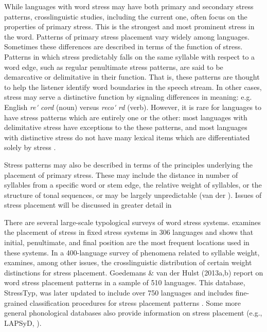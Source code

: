   While languages with word stress may have both primary and secondary stress patterns, crosslinguistic studies, including the current one, often focus on the properties of primary stress. This is the strongest and most prominent stress in the word. Patterns of primary stress placement vary widely among languages. Sometimes these differences are described in terms of the function of stress. Patterns in which stress predictably falls on the same syllable with respect to a word edge, such as regular penultimate stress patterns, are said to be demarcative or delimitative in their function. That is, these patterns are thought to help the listener identify word boundaries in the speech stream. In other cases, stress may serve a distinctive function by signaling differences in meaning: e.g. English \textit{re\'{} cord} (noun) versus \textit{reco\'{} rd} (verb). However, it is rare for languages to have stress patterns which are entirely one or the other: most languages with delimitative stress have exceptions to the these patterns, and most languages with distinctive stress do not have many lexical items which are differentiated solely by stress \citep[14-15]{Cruttenden1997}. 



  Stress patterns may also be described in terms of the principles underlying the placement of primary stress. These may include the distance in number of syllables from a specific word or stem edge, the relative weight of syllables, or the structure of tonal sequences, or may be largely unpredictable (van der \citealt{Hulst2010}). Issues of stress placement will be discussed in greater detail in 



  There are several large-scale typological surveys of word stress systems. \citet{Hyman1977} examines the placement of stress in fixed stress systems in 306 languages and shows that initial, penultimate, and final position are the most frequent locations used in these systems. In a 400-language survey of phenomena related to syllable weight, \citet{Gordon2006} examines, among other issues, the crosslinguistic distribution of certain weight distinctions for stress placement. Goedemans \& van der Hulst (2013a,b) report on word stress placement patterns in a sample of 510 languages. This database, StressTyp, was later updated to include over 750 languages and includes fine-grained classification procedures for stress placement patterns \citep{GoedemansEtAl2017}. Some more general phonological databases also provide information on stress placement (e.g., LAPSyD, \citealt{MaddiesonEtAl2013}).



